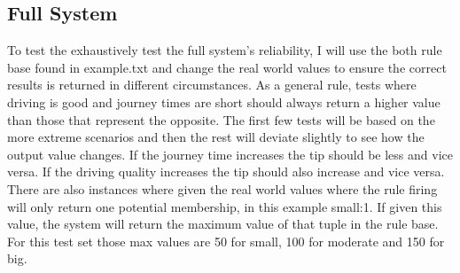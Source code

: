 \documentclass{article}
\begin{document}
\subsection{Full System}
To test the exhaustively test the full system’s reliability, I will use the both rule base found in example.txt and change the real world values to ensure the correct results is returned in different circumstances. As a general rule, tests where driving is good and journey times are short should always return a higher value than those that represent the opposite. The first few tests will be based on the more extreme scenarios and then the rest will deviate slightly to see how the output value changes. If the journey time increases the tip should be less and vice versa. If the driving quality increases the tip should also increase and vice versa. There are also instances where given the real world values where the rule firing will only return one potential membership, in this example {small:1}. If given this value, the system will return the maximum value of that tuple in the rule base. For this test set those max values are 50 for small, 100 for moderate and 150 for big.
\end{document}
